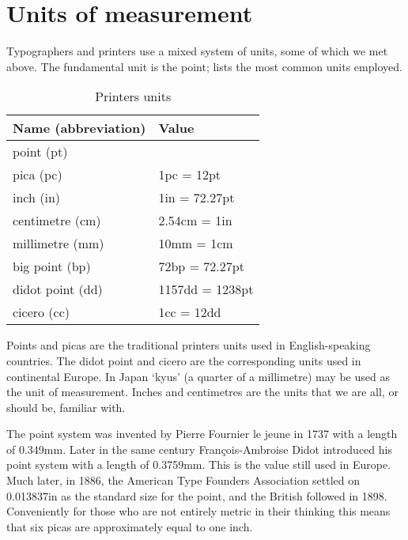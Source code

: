 \documentclass[10pt,letterpaper]{memoir}
\begin{document}
\section{Units of measurement}

    Typographers and printers use a mixed system of units, some of which
we met above. The fundamental unit is the point;  lists 
the most common units employed.

\begin{table}
\centering
\caption{Printers units} \label{tab:units}
\begin{tabular}{ll} \hline
Name (abbreviation) & Value \\ \hline
point (pt)\index{point}\index{pt}          &            \\
pica (pc)\index{pica}\index{pc}           & 1pc = 12pt \\
inch (in)\index{inch}\index{in}           & 1in = 72.27pt \\
centimetre (cm)\index{centimetre}\index{cm}     & 2.54cm = 1in \\
millimetre (mm)\index{millimetre}\index{mm}     & 10mm = 1cm \\ 
big point (bp)\index{big point}\index{bp}      & 72bp = 72.27pt \\
didot point (dd)\index{didot point}\index{dd}    & 1157dd = 1238pt \\
cicero (cc)\index{cicero}\index{cc}         & 1cc = 12dd \\
\hline
\end{tabular}
\end{table}

    Points and picas 
are the traditional printers units used in English-speaking countries. 
The didot point and cicero are the 
corresponding units used in continental Europe. In Japan `kyus'
(a quarter of a millimetre) may be used as the unit of measurement.
Inches and centimetres are the units that we
are all, or should be, familiar with.

    The point system was invented by Pierre Fournier le jeune in 1737 with
a length of 0.349mm. Later in the same century Fran\c{c}ois-Ambroise Didot
introduced his point system with a length of 0.3759mm. This is the value
still used in Europe. Much later, in 1886, the American Type Founders
Association settled on 0.013837in as the standard size for the point, and
the British followed in 1898. Conveniently for those who are not entirely
metric in their thinking this means that 
six picas are approximately equal to one inch.
\end{document}
